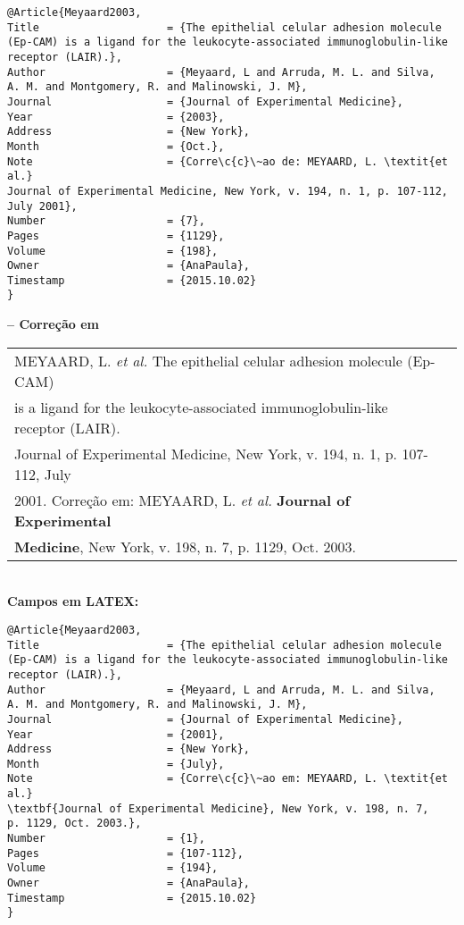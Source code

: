 \begin{verbatim}
@Article{Meyaard2003,
Title                    = {The epithelial celular adhesion molecule 
(Ep-CAM) is a ligand for the leukocyte-associated immunoglobulin-like 
receptor (LAIR).}, 
Author                   = {Meyaard, L and Arruda, M. L. and Silva, 
A. M. and Montgomery, R. and Malinowski, J. M},
Journal                  = {Journal of Experimental Medicine},
Year                     = {2003},
Address                  = {New York},
Month                    = {Oct.},
Note                     = {Corre\c{c}\~ao de: MEYAARD, L. \textit{et al.} 
Journal of Experimental Medicine, New York, v. 194, n. 1, p. 107-112, 
July 2001},
Number                   = {7},
Pages                    = {1129},
Volume                   = {198},
Owner                    = {AnaPaula},
Timestamp                = {2015.10.02}
}
\end{verbatim}

\textbf{-- Corre\c{c}\~ao em} \\

\begin{tabular}{|l|c|} \hline
	MEYAARD, L. \textit{et al.} The epithelial celular adhesion molecule (Ep-CAM)
	\\is a ligand for the leukocyte-associated immunoglobulin-like receptor
	(LAIR). \\Journal of Experimental Medicine, New York, v. 194, n. 1, p. 107-112, July \\2001. Corre\c{c}\~ao em: MEYAARD, L. \textit{et al.} \textbf{Journal of Experimental}\\ \textbf{Medicine}, New York, v. 198, n. 7, p. 1129, Oct. 2003. 
	\\\hline
\end{tabular} \\

\textbf{Campos em LATEX:} 

\begin{verbatim}
@Article{Meyaard2003,
Title                    = {The epithelial celular adhesion molecule 
(Ep-CAM) is a ligand for the leukocyte-associated immunoglobulin-like 
receptor (LAIR).},
Author                   = {Meyaard, L and Arruda, M. L. and Silva, 
A. M. and Montgomery, R. and Malinowski, J. M},
Journal                  = {Journal of Experimental Medicine},
Year                     = {2001},
Address                  = {New York},
Month                    = {July},
Note                     = {Corre\c{c}\~ao em: MEYAARD, L. \textit{et al.} 
\textbf{Journal of Experimental Medicine}, New York, v. 198, n. 7, 
p. 1129, Oct. 2003.},
Number                   = {1},
Pages                    = {107-112},
Volume                   = {194},
Owner                    = {AnaPaula},
Timestamp                = {2015.10.02}
}
\end{verbatim}


